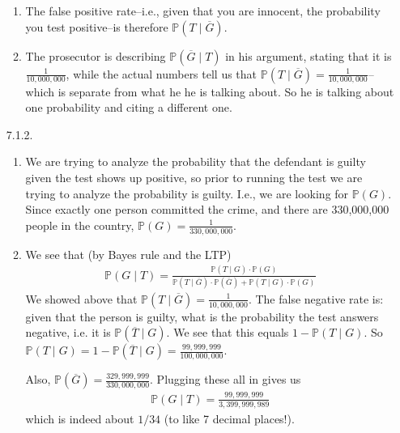 \documentclass[12pt]{article}
\renewcommand{\P}{\mathbb{P}}
\theoremstyle{definition}
\theoremstyle{remark}
\begin{document}
\begin{enumerate}[leftmargin=\labelsep]
\begin{enumerate}
			\item The false positive rate--i.e., given that you are innocent, the probability you test positive--is therefore $\P(T \mid \overline{G})$.
			
			\item The prosecutor is describing $\P(\overline{G} \mid T)$ in his argument, stating that it is $\frac{1}{10,000,000}$, while the actual numbers tell us that $\P(T \mid \overline{G}) = \frac{1}{10,000,000}$--which is separate from what he he is talking about. So he is talking about one probability and citing a different one.
		\end{enumerate}
		\item[7.1.2.]
		\begin{enumerate}
			\item We are trying to analyze the probability that the defendant is guilty given the test shows up positive, so prior to running the test we are trying to analyze the probability is guilty. I.e., we are looking for $\P(G)$. Since exactly one person committed the crime, and there are 330,000,000 people in the country, $\P(G) = \frac{1}{330,000,000}$.
			
			\item We see that (by Bayes rule and the LTP)
			\begin{align*}
				\P(G \mid T) = \frac{\P(T \mid G) \cdot \P(G)}{\P(T \mid \overline{G}) \cdot \P(\overline{G}) + \P(T \mid G) \cdot \P(G)}
			\end{align*}
			We showed above that $\P(T \mid \overline{G}) = \frac{1}{10,000,000}$. The false negative rate is: given that the person is guilty, what is the probability the test answers negative, i.e. it is $\P(\overline{T} \mid G)$. We see that this equals $1 - \P(T \mid G)$. So $\P(T \mid G) = 1 - \P(\overline{T} \mid G) = \frac{99,999,999}{100,000,000}$.
			
			Also, $\P(\overline{G}) = \frac{329,999,999}{330,000,000}$. Plugging these all in gives us
			\begin{align*}
				\P(G \mid T) = \frac{99,999,999}{3,399,999,989}
			\end{align*}
			which is indeed about $1/34$ (to like 7 decimal places!).
		\end{enumerate}
	

\end{enumerate}
\end{document}
